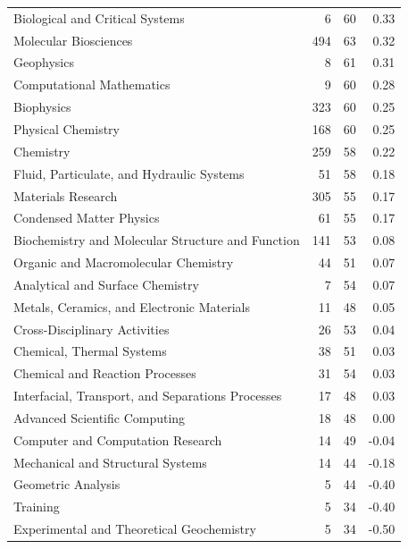 \documentclass{sig-alternate}
\begin{document}
\begin{table}[!htb]
{\begin{tabular}{p{}rrr}
Biological and Critical Systems & 6 &   60 &  0.33 \\
Molecular Biosciences &  494 &    63 &  0.32 \\
Geophysics &  8 &   61 &  0.31 \\
Computational Mathematics &   9 &   60 &  0.28 \\
Biophysics &  323 &    60 &  0.25 \\
Physical Chemistry &  168 &    60 &  0.25 \\
Chemistry &   259 &    58 &  0.22 \\
Fluid, Particulate, and Hydraulic Systems &   51 &  58 & 0.18 \\
Materials Research &  305 &    55 &  0.17 \\
Condensed Matter Physics &    61 &  55 &  0.17 \\
Biochemistry and Molecular Structure and Function &   141 &    53 &  0.08 \\
Organic and Macromolecular Chemistry &   44 &  51 &  0.07 \\
Analytical and Surface Chemistry &    7 &   54 &  0.07 \\
Metals, Ceramics, and Electronic Materials &  11 &  48 & 0.05 \\
Cross-Disciplinary Activities &  26 &  53 &  0.04 \\
Chemical, Thermal Systems &   38 &  51 &  0.03 \\
Chemical and Reaction Processes & 31 &  54 &  0.03 \\
Interfacial, Transport, and Separations Processes &   17 &  48 &  0.03 \\
Advanced Scientific Computing &  18 &  48 &  0.00 \\
Computer and Computation Research &   14 &  49 &  -0.04 \\
Mechanical and Structural Systems &   14 &  44 &  -0.18 \\
Geometric Analysis &  5 &   44 &  -0.40 \\
Training &    5 &   34 &  -0.40 \\
Experimental and Theoretical Geochemistry &   5 &   34 & -0.50 \\
\end{tabular}
}
\end{table}

 
%
%
 
 
\end{document}
